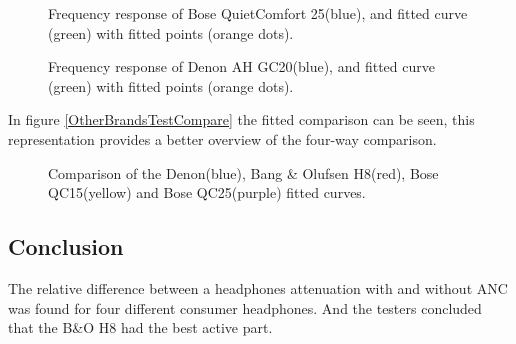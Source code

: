 \begin{figure}[H]
	\centering
	
	\caption{Frequency response of Bose QuietComfort 25(blue), and fitted curve (green) with fitted points (orange dots).}
	\label{fig:QC25Comp}
\end{figure}

\begin{figure}[H]
	\centering
	
	\caption{Frequency response of Denon AH GC20(blue), and fitted curve (green) with fitted points (orange dots).}
	\label{fig:DenonComp}
\end{figure}

In figure \autoref{OtherBrandsTestCompare} the fitted comparison can be seen, this representation provides a better overview of the four-way comparison.

\begin{figure}[H]
	\centering
	
	\caption{Comparison of the Denon(blue), Bang \& Olufsen H8(red), Bose QC15(yellow) and Bose QC25(purple) fitted curves.}
	\label{fig:OtherBrandsTestCompare}
\end{figure}



\subsection{Conclusion}
The relative difference between a headphones attenuation with and without ANC was found for four different consumer headphones. And the testers concluded that the B\&O H8 had the best active part.




